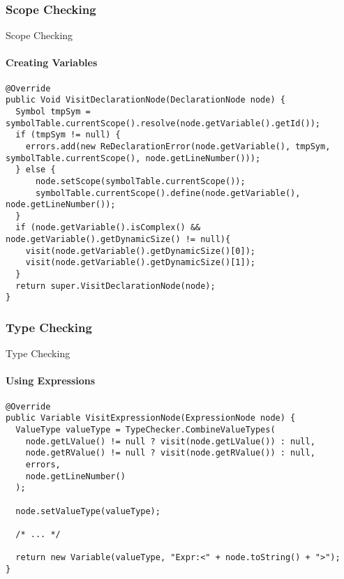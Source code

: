 \subsubsection{Scope Checking}
\begin{frame}[fragile,t]{Scope Checking}
\framesubtitle{Creating Variables}


\begin{lstlisting}[caption=The visit method for visiting a DeclarationNode in the Scope checker. ,frame=tlrb, basicstyle=\tiny, numbers=none]
@Override
public Void VisitDeclarationNode(DeclarationNode node) {
  Symbol tmpSym = symbolTable.currentScope().resolve(node.getVariable().getId());
  if (tmpSym != null) {
    errors.add(new ReDeclarationError(node.getVariable(), tmpSym, symbolTable.currentScope(), node.getLineNumber()));
  } else {
      node.setScope(symbolTable.currentScope());
      symbolTable.currentScope().define(node.getVariable(), node.getLineNumber());
  }
  if (node.getVariable().isComplex() && node.getVariable().getDynamicSize() != null){
    visit(node.getVariable().getDynamicSize()[0]);
    visit(node.getVariable().getDynamicSize()[1]);
  }
  return super.VisitDeclarationNode(node);
}
\end{lstlisting}

\end{frame}

\subsubsection{Type Checking}
\begin{frame}[fragile,t]{Type Checking}
\framesubtitle{Using Expressions}


\begin{lstlisting}[caption=The visit method for visiting a ExpressionNode in the Type checker. ,frame=tlrb, basicstyle=\tiny, numbers=none]
@Override
public Variable VisitExpressionNode(ExpressionNode node) {
  ValueType valueType = TypeChecker.CombineValueTypes(
    node.getLValue() != null ? visit(node.getLValue()) : null,
    node.getRValue() != null ? visit(node.getRValue()) : null,
    errors,
    node.getLineNumber()
  );

  node.setValueType(valueType);

  /* ... */

  return new Variable(valueType, "Expr:<" + node.toString() + ">");
}
\end{lstlisting}

\end{frame}

